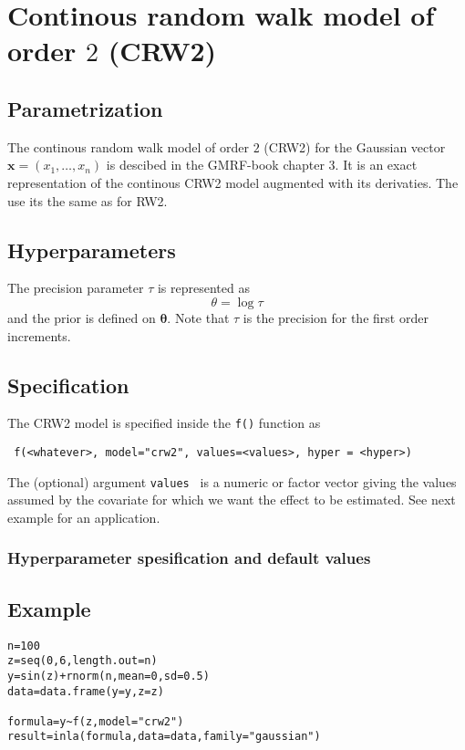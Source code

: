 \documentclass[a4paper,11pt]{article}
\begin{document}
\section*{Continous random walk model of order $2$ (CRW2)}

\subsection*{Parametrization}

The continous random walk model of order $2$ (CRW2) for the Gaussian
vector $\mathbf{x}=(x_1,\dots,x_n)$ is descibed in the GMRF-book
chapter 3. It is an exact representation of the continous CRW2 model
augmented with its derivaties. The use its the same as for RW2.

\subsection*{Hyperparameters}

The precision parameter $\tau$ is represented as
\begin{displaymath}
    \theta =\log \tau
\end{displaymath}
and the prior is defined on $\mathbf{\theta}$. Note that $\tau$ is the
precision for the first order increments.

\subsection*{Specification}

The CRW2 model is specified inside the {\tt f()} function as
\begin{verbatim}
 f(<whatever>, model="crw2", values=<values>, hyper = <hyper>)
\end{verbatim}
The (optional) argument {\tt values } is a numeric or factor vector
giving the values assumed by the covariate for which we want the
effect to be estimated. See next example for an application.
 
\subsubsection*{Hyperparameter spesification and default values}



\subsection*{Example}

\begin{verbatim}
n=100
z=seq(0,6,length.out=n)
y=sin(z)+rnorm(n,mean=0,sd=0.5)
data=data.frame(y=y,z=z)

formula=y~f(z,model="crw2")
result=inla(formula,data=data,family="gaussian")
\end{verbatim}
\end{document}
